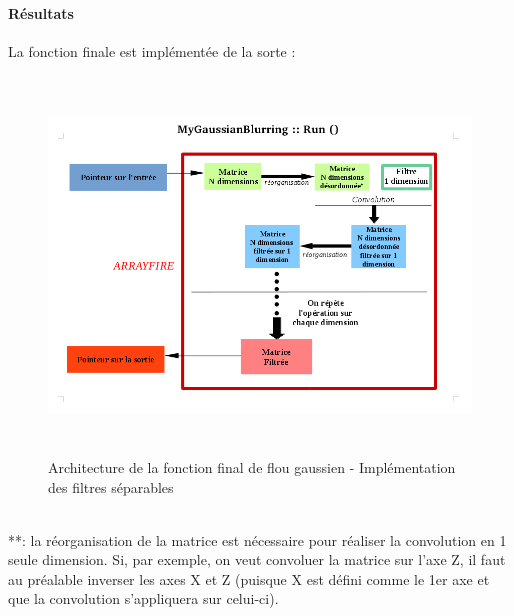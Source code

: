 \documentclass{report}
\begin{document}
\paragraph{Résultats}
La fonction finale est implémentée de la sorte :
\begin{figure}[h!]
	\begin{center}
		\includegraphics[height=10cm]{figures/mygaussianblurring.png}
		\caption{Architecture de la fonction final de flou gaussien - Implémentation des filtres séparables}
		\label{Architecture de la fonction finale de flou gaussien - Implémentation des filtres séparables}
	\end{center}
\end{figure}
\\
**: la réorganisation de la matrice est nécessaire pour réaliser la convolution en 1 seule dimension. Si, par exemple, on veut convoluer la matrice sur l'axe Z, il faut au préalable inverser les axes X et Z (puisque X est défini comme le 1er axe et que la convolution s'appliquera sur celui-ci). 
\end{document}
